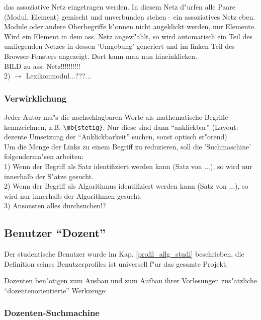 \begin{enumerate}
    das assoziative Netz eingetragen werden.
    In diesem Netz d"urfen alle Paare (Modul, Element) gemischt
    und unverbunden stehen - ein assoziatives Netz eben. \\
    Module oder andere Oberbegriffe k"onnen nicht angeklickt
    werden, nur Elemente.\\
    Wird ein Element in dem ass. Netz angew"ahlt, so wird
    automatisch ein Teil des umliegenden Netzes in dessen
    'Umgebung' generiert und im linken Teil des Browser-Fensters
    angezeigt. Dort kann man nun hineinklicken.\\
    BILD zu ass. Netz!!!!!!!!!!\\
    2) $\rightarrow$ Lexikonmodul...???...
\end{enumerate}

\subsubsection{Verwirklichung}
    Jeder Autor mu"s die nachschlagbaren Worte als mathematische
    Begriffe kennzeichnen, z.B. \verb?\mb{stetig}?. 
    Nur diese sind dann ``anklickbar'' (Layout: dezente Umsetzung 
    der ``Anklickbarkeit'' suchen, sonst optisch st"orend) \\
    Um die Menge der Links zu einem Begriff zu reduzieren, soll
    die 'Suchmaschine' folgenderma"sen arbeiten:\\
    1) Wenn der Begriff als Satz identifiziert werden kann (Satz von
    ...), so wird nur innerhalb der S"atze gesucht.\\
    2) Wenn der Begriff als Algorithmus identifiziert werden kann (Satz von
    ...), so wird nur innerhalb der Algorithmen gesucht.\\
    3) Ansonsten alles durchsuchen!?


\subsection{Benutzer ``Dozent''}

Der studentische Benutzer wurde im Kap. \ref{profil_allg_studi}
beschrieben, die Definition seines Benutzerprofiles ist universell
f"ur das gesamte Projekt.

Dozenten ben"otigen zum Ausbau und zum Aufbau ihrer Vorlesungen
zus"atzliche ``dozentenorientierte'' Werkzeuge:


\subsubsection{Dozenten-Suchmachine}


